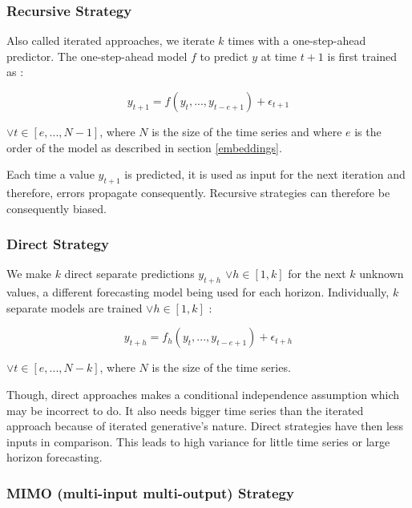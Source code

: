 \documentclass[11pt,a4paper,oneside]{book}
\begin{document}
\subsubsection{Recursive Strategy}

Also called iterated approaches, we iterate $k$ times with a one-step-ahead predictor. The one-step-ahead model $f$ to predict $y$ at time $t+1$ is first trained as : 

\begin{equation}
    y_{t + 1} =f(y_t,...,y_{t − e + 1}) + \epsilon_{t + 1}
\end{equation}

$\vee t \in \left[e,..., N - 1\right]$, where $N$ is the size of the time series and where $e$ is the order of the model as described in section \ref{embeddings}. \cite{souahib2}

Each time a value $y_{t+1}$ is predicted, it is used as input for the next iteration and therefore, errors propagate consequently. Recursive strategies can therefore be consequently biased. \cite{BenTaieb}


\subsubsection{Direct Strategy}

We make $k$ direct separate predictions $y_{t+h}$ $\vee h \in \left[1, k\right]$ for the next $k$ unknown values, a different forecasting model being used for each horizon. Individually, $k$ separate models are trained $\vee h \in \left[1, k\right]$ : 

\begin{equation}
    y_{t + h} = f_h(y_t,...,y_{t − e + 1}) + \epsilon_{t + h}
\end{equation}

$\vee t \in \left[e,..., N - k\right]$, where $N$ is the size of the time series. \cite{souahib2}

Though, direct approaches makes a conditional independence assumption which may be incorrect to do. It also needs bigger time series than the iterated approach because of iterated generative's nature. Direct strategies have then less inputs in comparison. This leads to high variance for little time series or large horizon forecasting. \cite{BenTaieb}


\subsubsection{MIMO (multi-input multi-output) Strategy}
\end{document}
